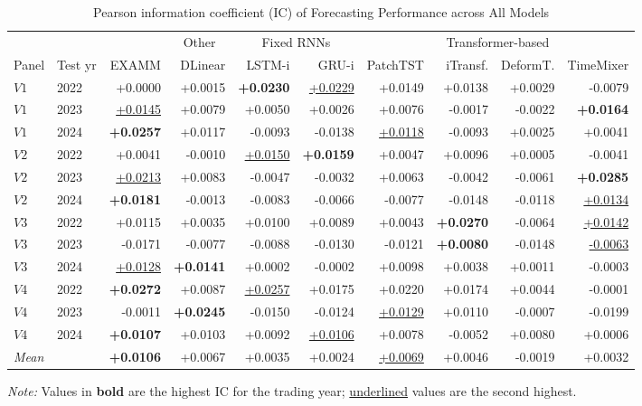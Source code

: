 \begin{table}[t]
\centering
\caption{Pearson information coefficient (IC) of Forecasting Performance across All Models}
\label{tab:ic}
\begin{threeparttable}
\footnotesize
\begin{tabular}{llrrrrrrrr}
\toprule
 & &  & \multicolumn{1}{c}{Other} & \multicolumn{2}{c}{Fixed RNNs} & \multicolumn{4}{c}{Transformer-based} \\
\cmidrule(lr){4-4} \cmidrule(lr){5-6} \cmidrule(lr){7-10}
Panel & Test yr & EXAMM & DLinear & LSTM-i & GRU-i & PatchTST & iTransf. & DeformT. & TimeMixer \\
\midrule
$V1$ & 2022 & +0.0000 & +0.0015 & \textbf{+0.0230} & \underline{+0.0229} & +0.0149 & +0.0138 & +0.0029 & -0.0079 \\
$V1$ & 2023 & \underline{+0.0145} & +0.0079 & +0.0050 & +0.0026 & +0.0076 & -0.0017 & -0.0022 & \textbf{+0.0164} \\
$V1$ & 2024 & \textbf{+0.0257} & +0.0117 & -0.0093 & -0.0138 & \underline{+0.0118} & -0.0093 & +0.0025 & +0.0041 \\
\addlinespace
$V2$ & 2022 & +0.0041 & -0.0010 & \underline{+0.0150} & \textbf{+0.0159} & +0.0047 & +0.0096 & +0.0005 & -0.0041 \\
$V2$ & 2023 & \underline{+0.0213} & +0.0083 & -0.0047 & -0.0032 & +0.0063 & -0.0042 & -0.0061 & \textbf{+0.0285} \\
$V2$ & 2024 & \textbf{+0.0181} & -0.0013 & -0.0083 & -0.0066 & -0.0077 & -0.0148 & -0.0118 & \underline{+0.0134} \\
\addlinespace
$V3$ & 2022 & +0.0115 & +0.0035 & +0.0100 & +0.0089 & +0.0043 & \textbf{+0.0270} & -0.0064 & \underline{+0.0142} \\
$V3$ & 2023 & -0.0171 & -0.0077 & -0.0088 & -0.0130 & -0.0121 & \textbf{+0.0080} & -0.0148 & \underline{-0.0063} \\
$V3$ & 2024 & \underline{+0.0128} & \textbf{+0.0141} & +0.0002 & -0.0002 & +0.0098 & +0.0038 & +0.0011 & -0.0003 \\
\addlinespace
$V4$ & 2022 & \textbf{+0.0272} & +0.0087 & \underline{+0.0257} & +0.0175 & +0.0220 & +0.0174 & +0.0044 & -0.0001 \\
$V4$ & 2023 & -0.0011 & \textbf{+0.0245} & -0.0150 & -0.0124 & \underline{+0.0129} & +0.0110 & -0.0007 & -0.0199 \\
$V4$ & 2024 & \textbf{+0.0107} & +0.0103 & +0.0092 & \underline{+0.0106} & +0.0078 & -0.0052 & +0.0080 & +0.0006 \\
\midrule
\multicolumn{2}{l}{\textit{Mean}} & \textbf{+0.0106} & +0.0067 & +0.0035 & +0.0024 & \underline{+0.0069} & +0.0046 & -0.0019 & +0.0032 \\
\bottomrule

\end{tabular}%
\begin{tablenotes}[flushleft]
\footnotesize
\item \textit{Note:} Values in \textbf{bold} are the highest IC for the trading year; \underline{underlined} values are the second highest.
\end{tablenotes}
\end{threeparttable}
\end{table}
